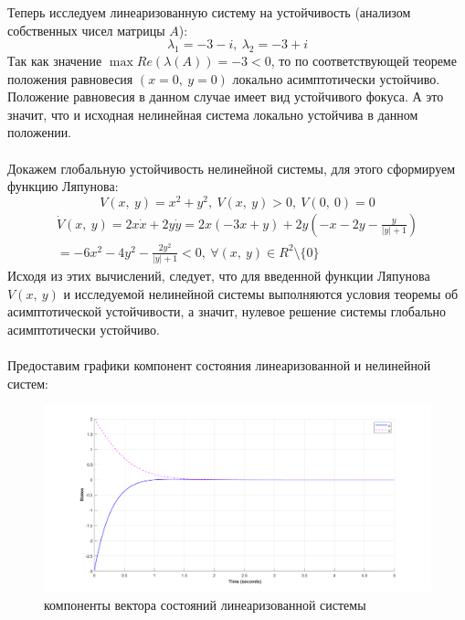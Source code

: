 \documentclass[12pt]{article}
\begin{document}
Теперь исследуем линеаризованную систему на устойчивость (анализом собственных чисел матрицы $A$):
\[
\lambda_1 = -3 - i, \ \lambda_2 = -3 + i
\]
Так как значение $\max{Re(\lambda(A))} = -3 < 0$, то по соответствующей теореме положения равновесия $(x=0, \ y=0)$ локально асимптотически устойчиво. Положение равновесия в данном случае имеет вид устойчивого фокуса. А это значит, что и исходная нелинейная система локально устойчива в данном положении.\\
\ \\
Докажем глобальную устойчивость нелинейной системы, для этого сформируем функцию Ляпунова:
\[
V(x, \ y) = x^2 + y^2, \ V(x, \ y) > 0, \ V(0, \ 0) = 0
\]
\[
\begin{split}
    \dot{V}(x, \ y) = 2x\dot{x} + 2y\dot{y} = 2x(-3x + y) + 2y(-x - 2y - \frac{y}{|y| + 1}) \\
    = -6x^2 - 4y^2 - \frac{2y^2}{|y|+1} < 0, \ \forall (x, \ y) \in R^2 \setminus \{0\}
\end{split}
\]
Исходя из этих вычислений, следует, что для введенной функции Ляпунова $V(x, \ y)$ и исследуемой нелинейной системы выполняются условия теоремы об асимптотической устойчивости, а значит, нулевое решение системы глобально
асимптотически устойчиво.\\
\ \\
Предоставим графики компонент состояния линеаризованной и нелинейной систем:\\

\begin{figure}[h!]
    \centering
    \includegraphics[width=\textwidth]{lin_states}
    \caption{компоненты вектора состояний линеаризованной системы}
    \label{fig:lin_states}
\end{figure}
\end{document}
